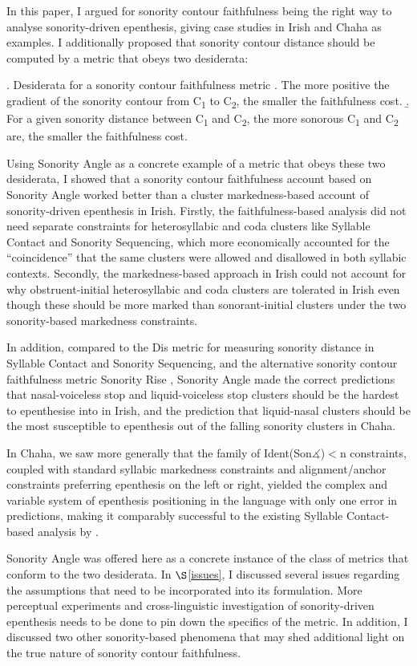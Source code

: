 \documentclass[12pt]{article}
\begin{document}
In this paper, I argued for sonority contour faithfulness being the right way to analyse sonority-driven epenthesis, giving case studies in Irish and Chaha as examples. I additionally proposed that sonority contour distance should be computed by a metric that obeys two desiderata:

\ex. Desiderata for a sonority contour faithfulness metric 
     \a. The more positive the gradient of the sonority contour from C\textsubscript{1} to C\textsubscript{2}, the smaller the faithfulness cost. 
     \b. For a given sonority distance between C\textsubscript{1} and C\textsubscript{2}, the more sonorous C\textsubscript{1} and C\textsubscript{2} are, the smaller the faithfulness cost.

Using {\sc Sonority Angle} as a concrete example of a metric that obeys these two desiderata, I showed that  a sonority contour faithfulness account based on {\sc Sonority Angle} worked better than a cluster markedness-based account of sonority-driven epenthesis in Irish. Firstly, the faithfulness-based analysis did not need separate constraints for heterosyllabic and coda clusters like Syllable Contact and Sonority Sequencing, which more economically accounted for the ``coincidence'' that the same clusters were allowed and disallowed in both syllabic contexts. Secondly, the markedness-based approach in Irish could not account for why obstruent-initial heterosyllabic and coda clusters are tolerated in Irish even though these should be more marked than sonorant-initial clusters under the two sonority-based markedness constraints.

In addition, compared to the {\sc *Dis} metric \citep{gouskova.2002} for measuring sonority distance in Syllable Contact and Sonority Sequencing, and the alternative sonority contour faithfulness metric {\sc Sonority Rise} \citep{flemming.2008}, {\sc Sonority Angle} made the correct predictions that nasal-voiceless stop and liquid-voiceless stop clusters should be the hardest to epenthesise into in Irish, and the prediction that liquid-nasal clusters should be the most susceptible to epenthesis out of the falling sonority clusters in Chaha.

In Chaha, we saw more generally that the family of {\sc Ident(Son$\measuredangle$)}$<$n constraints, coupled with standard syllabic markedness constraints and alignment/anchor constraints preferring epenthesis on the left or right, yielded the complex and variable system of epenthesis positioning in the language with only one error in predictions, making it comparably successful to the existing Syllable Contact-based analysis by \cite{rose.2000}.

{\sc Sonority Angle} was offered here as a concrete instance of the class of metrics that conform to the two desiderata. In $\S$\ref{issues}, I discussed several issues regarding the assumptions that need to be incorporated into its formulation. More perceptual experiments and cross-linguistic investigation of sonority-driven epenthesis needs to be done to pin down the specifics of the metric. In addition, I discussed two other sonority-based phenomena that may shed additional light on the true nature of sonority contour faithfulness.



\end{document}
